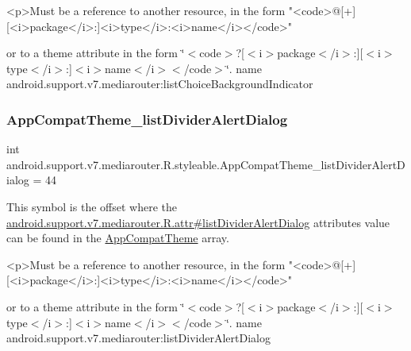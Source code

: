 \begin{DoxyVerb}      <p>Must be a reference to another resource, in the form "<code>@[+][<i>package</i>:]<i>type</i>:<i>name</i></code>"
\end{DoxyVerb}
 or to a theme attribute in the form \char`\"{}$<$code$>$?\mbox{[}$<$i$>$package$<$/i$>$\+:\mbox{]}\mbox{[}$<$i$>$type$<$/i$>$\+:\mbox{]}$<$i$>$name$<$/i$>$$<$/code$>$\char`\"{}.  name android.\+support.\+v7.\+mediarouter\+:list\+Choice\+Background\+Indicator \mbox{\label{classandroid_1_1support_1_1v7_1_1mediarouter_1_1R_1_1styleable_ac591345fbb2242bdd017831f3945bb54}} 
\subsubsection{\texorpdfstring{App\+Compat\+Theme\+\_\+list\+Divider\+Alert\+Dialog}{AppCompatTheme\_listDividerAlertDialog}}
{\footnotesize\ttfamily int android.\+support.\+v7.\+mediarouter.\+R.\+styleable.\+App\+Compat\+Theme\+\_\+list\+Divider\+Alert\+Dialog = 44\hspace{0.3cm}{\ttfamily [static]}}

This symbol is the offset where the \hyperlink{classandroid_1_1support_1_1v7_1_1mediarouter_1_1R_1_1attr_a99270b2c4e90683ae9ac0c8d7ff8d52e}{android.\+support.\+v7.\+mediarouter.\+R.\+attr\#list\+Divider\+Alert\+Dialog} attribute\textquotesingle{}s value can be found in the \hyperlink{classandroid_1_1support_1_1v7_1_1mediarouter_1_1R_1_1styleable_a4e3d3900c75d49aeb2f283cac00214d6}{App\+Compat\+Theme} array.

\begin{DoxyVerb}      <p>Must be a reference to another resource, in the form "<code>@[+][<i>package</i>:]<i>type</i>:<i>name</i></code>"
\end{DoxyVerb}
 or to a theme attribute in the form \char`\"{}$<$code$>$?\mbox{[}$<$i$>$package$<$/i$>$\+:\mbox{]}\mbox{[}$<$i$>$type$<$/i$>$\+:\mbox{]}$<$i$>$name$<$/i$>$$<$/code$>$\char`\"{}.  name android.\+support.\+v7.\+mediarouter\+:list\+Divider\+Alert\+Dialog \mbox{\label{classandroid_1_1support_1_1v7_1_1mediarouter_1_1R_1_1styleable_a20960f3bfbaeac45f2f88f8fdedb6eb8}} 
